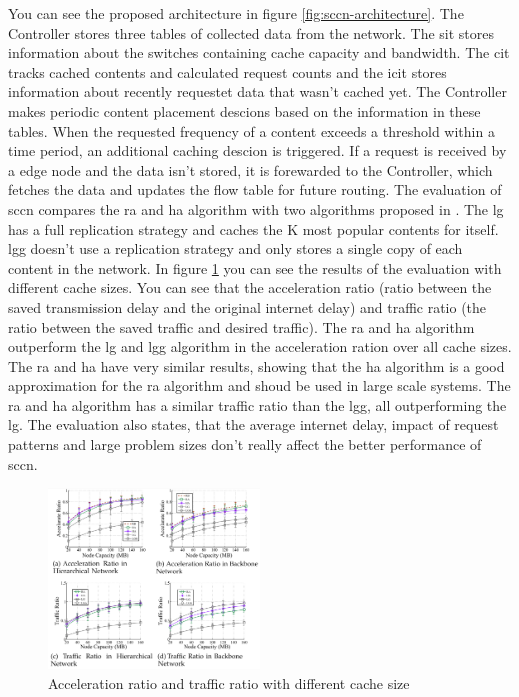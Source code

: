 \documentclass[conference]{IEEEtran}
\begin{document}
	You can see the proposed architecture in figure \ref{fig:sccn-architecture}. The Controller stores three tables of collected data from the network. The \ac{sit} stores information about the switches containing cache capacity and bandwidth. The \ac{cit} tracks cached contents and calculated request counts and the \ac{icit} stores information about recently requestet data that wasn't cached yet. The Controller makes periodic content placement descions based on the information in these tables. When the requested frequency  of a content exceeds a threshold within a time period, an additional caching descion is triggered. 
	If a request is received by a edge node and the data isn't stored, it is forewarded to the Controller, which fetches the data and updates the flow table for future routing. The evaluation of \ac{sccn} compares the \ac{ra} and \ac{ha} algorithm with two algorithms proposed in \cite{caching-8}. The \ac{lg}  has a full replication strategy and caches the K most popular contents for itself. \ac{lgg} doesn't use a replication strategy and only stores a single copy of each content in the network.
	In figure \ref{fig:sccn-result} you can see the results of the evaluation with different cache sizes. You can see that the acceleration ratio (ratio between the saved transmission delay and the original internet delay) and traffic ratio (the ratio between the saved traffic and desired traffic). The \ac{ra} and \ac{ha} algorithm outperform the \ac{lg} and \ac{lgg} algorithm in the acceleration ration over all cache sizes. The \ac{ra} and \ac{ha} have very similar results, showing that the \ac{ha} algorithm is a good approximation for the \ac{ra} algorithm and shoud be used in large scale systems. The \ac{ra} and \ac{ha} algorithm has a similar traffic ratio than the \ac{lgg}, all outperforming the \ac{lg}. The evaluation also states, that the average internet delay, impact of request patterns and large problem sizes don't really affect the better performance of \ac{sccn}.

	\begin{figure}
		\centering
		\includegraphics[width=0.5\textwidth]{figures/sccn-result.png}
		\caption{Acceleration ratio and traffic ratio with different cache size \cite{caching-7}}
		\label{fig:sccn-result}
	\end{figure}
\end{document}
